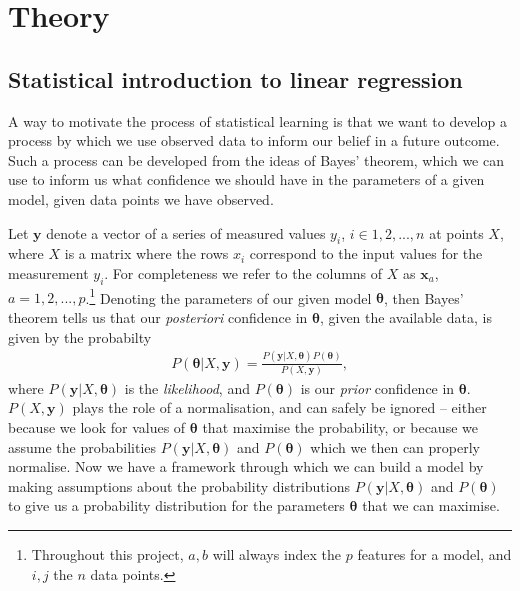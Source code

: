 \documentclass[twocolumn,english,notitlepage]{article}
\renewcommand{\vec}[1]{\boldsymbol{#1}}
\begin{document}
\section{Theory}
    \subsection{Statistical introduction to linear regression}
        A way to motivate the process of statistical learning is that we want to develop a process by which we use observed data to inform our belief in a future outcome. Such a process can be developed from the ideas of Bayes' theorem, which we can use to inform us what confidence we should have in the parameters of a given model, given data points we have observed.
        
        Let $\vec{y}$ denote a vector of a series of measured values $y_i$, $i\in 1, 2,..., n$ at points $X$, where $X$ is a matrix where the rows $x_i$ correspond to the input values for the measurement $y_i$. For completeness we refer to the columns of $X$ as $\vec{x}_a$, $a=1, 2,..., p$.\footnote{Throughout this project, $a, b$ will always index the $p$ features for a model, and $i, j$ the $n$ data points.} Denoting the parameters of our given model $\vec{\theta}$, then Bayes' theorem tells us that our \textit{posteriori} confidence in $\vec{\theta}$, given the available data, is given by the probabilty
        \begin{align}
            P(\vec{\theta}|X, \vec{y}) = \frac{P(\vec{y}|X,\vec{\vec{\theta}})P(\vec{\theta})}{P(X,\vec{y})},
        \end{align}
        where $P(\vec{y}|X, \vec{\theta})$ is the \textit{likelihood}, and $P(\vec{\theta})$ is our \textit{prior} confidence in $\vec{\theta}$. $P(X,\vec{y})$ plays the role of a normalisation, and can safely be ignored -- either because we look for values of $\vec{\theta}$ that maximise the probability, or because we assume the probabilities $P(\vec{y}|X,\vec{\theta})$ and $P(\vec{\theta})$ which we then can properly normalise. Now we have a framework through which we can build a model by making assumptions about the probability distributions $P(\vec{y}|X,\vec{\theta})$ and $P(\vec{\theta})$ to give us a probability distribution for the parameters $\vec{\theta}$ that we can maximise.
\end{document}
